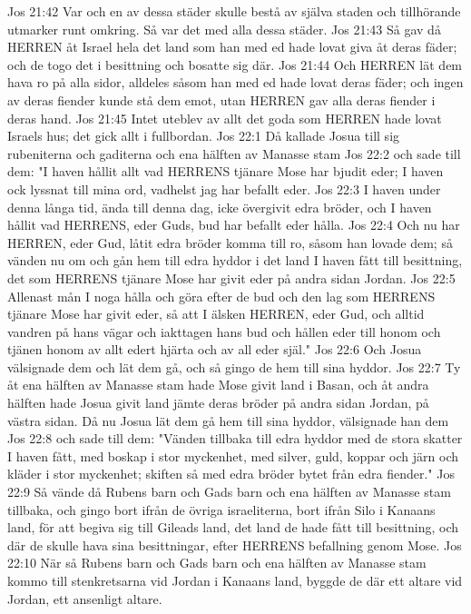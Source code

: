 Jos 21:42  Var och en av dessa städer skulle bestå av själva staden och tillhörande utmarker runt omkring. Så var det med alla dessa städer.
Jos 21:43  Så gav då HERREN åt Israel hela det land som han med ed hade lovat giva åt deras fäder; och de togo det i besittning och bosatte sig där.
Jos 21:44  Och HERREN lät dem hava ro på alla sidor, alldeles såsom han med ed hade lovat deras fäder; och ingen av deras fiender kunde stå dem emot, utan HERREN gav alla deras fiender i deras hand.
Jos 21:45  Intet uteblev av allt det goda som HERREN hade lovat Israels hus; det gick allt i fullbordan.
Jos 22:1  Då kallade Josua till sig rubeniterna och gaditerna och ena hälften av Manasse stam
Jos 22:2  och sade till dem: "I haven hållit allt vad HERRENS tjänare Mose har bjudit eder; I haven ock lyssnat till mina ord, vadhelst jag har befallt eder.
Jos 22:3  I haven under denna långa tid, ända till denna dag, icke övergivit edra bröder, och I haven hållit vad HERRENS, eder Guds, bud har befallt eder hålla.
Jos 22:4  Och nu har HERREN, eder Gud, låtit edra bröder komma till ro, såsom han lovade dem; så vänden nu om och gån hem till edra hyddor i det land I haven fått till besittning, det som HERRENS tjänare Mose har givit eder på andra sidan Jordan.
Jos 22:5  Allenast mån I noga hålla och göra efter de bud och den lag som HERRENS tjänare Mose har givit eder, så att I älsken HERREN, eder Gud, och alltid vandren på hans vägar och iakttagen hans bud och hållen eder till honom och tjänen honom av allt edert hjärta och av all eder själ."
Jos 22:6  Och Josua välsignade dem och lät dem gå, och så gingo de hem till sina hyddor.
Jos 22:7  Ty åt ena hälften av Manasse stam hade Mose givit land i Basan, och åt andra hälften hade Josua givit land jämte deras bröder på andra sidan Jordan, på västra sidan. Då nu Josua lät dem gå hem till sina hyddor, välsignade han dem
Jos 22:8  och sade till dem: "Vänden tillbaka till edra hyddor med de stora skatter I haven fått, med boskap i stor myckenhet, med silver, guld, koppar och järn och kläder i stor myckenhet; skiften så med edra bröder bytet från edra fiender."
Jos 22:9  Så vände då Rubens barn och Gads barn och ena hälften av Manasse stam tillbaka, och gingo bort ifrån de övriga israeliterna, bort ifrån Silo i Kanaans land, för att begiva sig till Gileads land, det land de hade fått till besittning, och där de skulle hava sina besittningar, efter HERRENS befallning genom Mose.
Jos 22:10  När så Rubens barn och Gads barn och ena hälften av Manasse stam kommo till stenkretsarna vid Jordan i Kanaans land, byggde de där ett altare vid Jordan, ett ansenligt altare.
